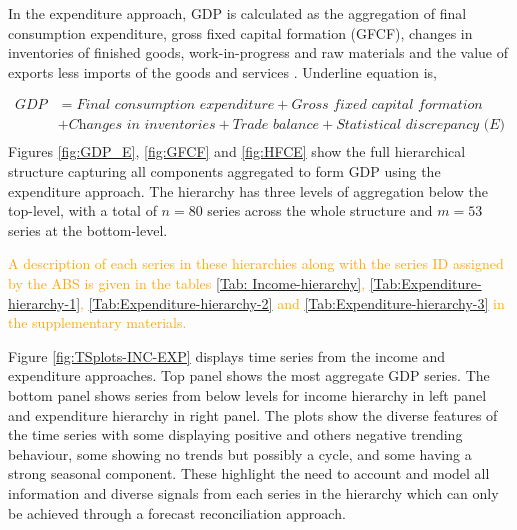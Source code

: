 \documentclass[graybox]{svmult}
\begin{document}
In the expenditure approach, GDP is calculated as the aggregation of final consumption expenditure, gross fixed capital formation (GFCF), changes in inventories of finished goods, work-in-progress and raw materials and the value of exports less imports of the goods and services \citep{ABS2015}. Underline equation is,

\begin{align*}
	\textit{GDP} &= \textit{Final consumption expenditure} + \textit{Gross fixed capital formation} \\ & + \textit{Changes in inventories} + \textit{Trade balance}+\textit{Statistical discrepancy (E)}\\
	\end{align*}
Figures \ref{fig:GDP_E}, \ref{fig:GFCF} and \ref{fig:HFCE} show the full hierarchical structure capturing all components aggregated to form GDP using the expenditure approach. The hierarchy has three levels of aggregation below the top-level, with a total of $n=80$ series across the whole structure and $m=53$ series at the bottom-level.

\textcolor{orange}{A description of each series in these hierarchies along with the series ID assigned by the ABS is given in the tables \ref{Tab: Income-hierarchy}, \ref{Tab:Expenditure-hierarchy-1}, \ref{Tab:Expenditure-hierarchy-2} and \ref{Tab:Expenditure-hierarchy-3} in the supplementary materials.}


Figure \ref{fig:TSplots-INC-EXP} displays time series from the income and expenditure approaches. Top panel shows the most aggregate GDP series. The bottom panel shows series from below levels for income hierarchy in left panel and expenditure hierarchy in right panel. The plots show the diverse features of the time series with some displaying positive and others negative trending behaviour, some showing no trends but possibly a cycle, and some having a strong seasonal component. These highlight the need to account and model all information and diverse signals from each series in the hierarchy which can only be achieved through a forecast reconciliation approach.
\end{document}
